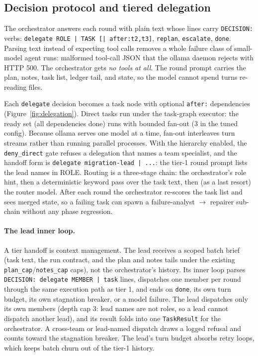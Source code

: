 \documentclass[11pt]{article}
\begin{document}
\subsection{Decision protocol and tiered delegation}

The orchestrator answers each round with plain text whose lines carry
\texttt{DECISION:} verbs: \texttt{delegate ROLE | TASK [|
  after:t2,t3]}, \texttt{replan}, \texttt{escalate},
\texttt{done}. Parsing text instead of expecting tool calls removes a
whole failure class of small-model agent runs: malformed tool-call JSON
that the ollama daemon rejects with HTTP 500. The
orchestrator gets \emph{no tools at all}. The round prompt
carries the plan, notes, task list, ledger tail, and state, so the model
cannot spend turns re-reading files.

Each \texttt{delegate} decision becomes a task node with optional
\texttt{after:} dependencies (Figure~\ref{fig:delegation}). Direct tasks
run under the task-graph executor: the ready set (all dependencies done)
runs with bounded fan-out (3 in the tuned config). Because ollama serves
one model at a time, fan-out interleaves turn streams rather than
running parallel processes. With the hierarchy enabled, the
\texttt{deny\_direct} gate refuses a delegation that names a team
specialist, and the handoff form is \texttt{delegate migration-lead |
  ...}: the tier-1 round prompt lists the lead names in ROLE. Routing is
a three-stage chain: the orchestrator's role hint, then a
deterministic keyword pass over the task text, then (as a last resort)
the router model. After each round the orchestrator re-scores the task
list and sees merged state, so a failing task can spawn a
failure-analyst $\rightarrow$ repairer sub-chain without any phase
regression.

\paragraph{The lead inner loop.}
A tier handoff is context management. The lead receives a scoped batch
brief (task text, the run contract, and the plan and notes tails under
the existing \texttt{plan\_cap}/\texttt{notes\_cap} caps), not the
orchestrator's history. Its inner loop parses \texttt{DECISION: delegate
  MEMBER | task} lines, dispatches one member per round through the same
execution path as tier 1, and ends on \texttt{done}, its own turn
budget, its own stagnation breaker, or a model failure. The lead
dispatches only its own members (depth cap 3: lead names are not roles,
so a lead cannot dispatch another lead), and its result folds into one
\texttt{TaskResult} for the orchestrator. A cross-team or lead-named
dispatch draws a logged refusal and counts toward the stagnation
breaker. The lead's turn budget absorbs retry loops, which keeps batch
churn out of the tier-1 history.
\end{document}

